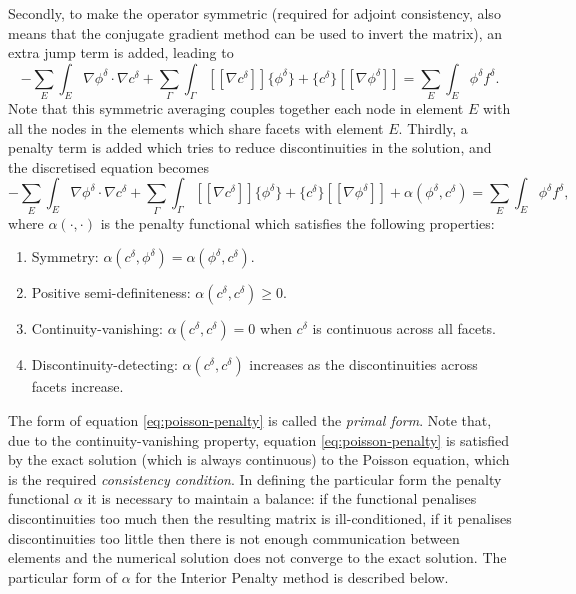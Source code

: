 Secondly, to make the operator symmetric (required for adjoint
consistency, also means that the conjugate gradient method can be used
to invert the matrix), an extra jump term is added, leading to
\begin{equation}
\label{eq:poisson-parts-facets-average-symmetric}
-\sum_E\int_E\nabla \phi^\delta\cdot\nabla c^\delta +
\sum_\Gamma\int_{\Gamma} [[\nabla c^\delta]]\{\phi^\delta\} +
\{c^\delta\}
[[\nabla\phi^\delta]] = \sum_E\int_E \phi^\delta f^{\delta}.
\end{equation}
Note that this symmetric averaging couples together each node in
element $E$ with all the nodes in the elements which share facets with
element $E$. Thirdly, a penalty term is added which tries to reduce
discontinuities in the solution, and the discretised equation becomes
\begin{equation}
\label{eq:poisson-penalty}
-\sum_E\int_E\nabla \phi^\delta\cdot\nabla c^\delta +
\sum_\Gamma\int_{\Gamma} [[\nabla c^\delta]]\{\phi^\delta\} +
\{c^\delta\}
[[\nabla\phi^\delta]] + \alpha(\phi^\delta,c^\delta)
= \sum_E\int_E \phi^\delta f^{\delta},
\end{equation}
where $\alpha(\cdot,\cdot)$ is the penalty functional which satisfies
the following properties:
\begin{enumerate}
\item Symmetry:
  $\alpha(c^\delta,\phi^\delta)=\alpha(\phi^\delta,c^\delta)$.
\item Positive semi-definiteness: $\alpha(c^\delta,c^\delta)\geq 0$.
\item Continuity-vanishing: $\alpha(c^\delta,c^\delta)=0$ when $c^\delta$ is continuous
 across all facets.
\item Discontinuity-detecting: $\alpha(c^\delta,c^\delta)$ increases
  as the discontinuities across facets increase.
\end{enumerate}
The form of equation \eqref{eq:poisson-penalty} is called the
\emph{primal form}.  Note that, due to the continuity-vanishing
property, equation \eqref{eq:poisson-penalty} is satisfied by the
exact solution (which is always continuous) to the Poisson equation,
which is the required \emph{consistency condition}.  In defining the
particular form the penalty functional $\alpha$ it is necessary to
maintain a balance: if the functional penalises discontinuities too
much then the resulting matrix is ill-conditioned, if it penalises
discontinuities too little then there is not enough communication
between elements and the numerical solution does not converge to the
exact solution. The particular form of $\alpha$ for the Interior
Penalty method is described below.

